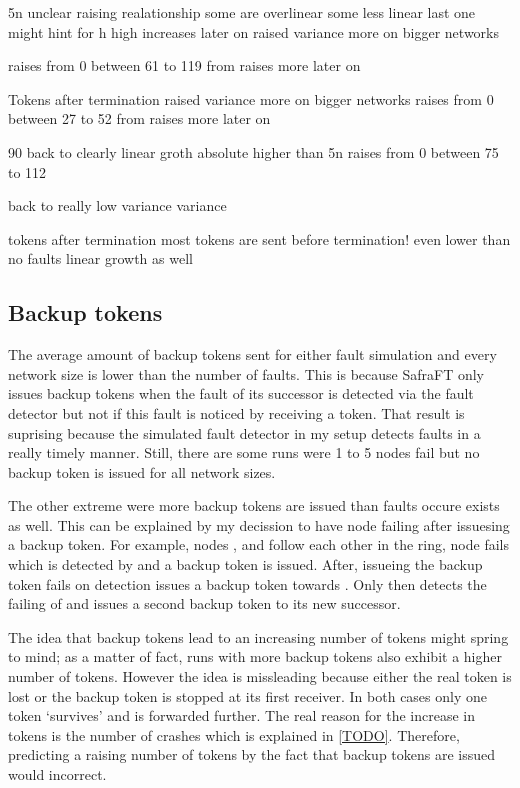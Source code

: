 5n
 unclear raising realationship some are overlinear some less linear last one might hint for h
 high increases later on
 raised variance more on bigger networks
 
 raises from 0 between 61 to 119 from 
   raises more later on
 
 Tokens after termination 
   raised variance more on bigger networks
    raises from 0 between 27 to 52 from 
      raises more later on
   
 
 
90 
  back to clearly linear groth
  absolute higher than 5n 
  raises from 0 between 75 to 112
  
  back to really low variance variance
  
  tokens after termination
    most tokens are sent before termination! 
    even lower than no faults
    linear growth as well
    
\subsection{Backup tokens}
The average amount of backup tokens sent for either fault simulation and every network size is lower than the number of faults.
This is because SafraFT only issues backup tokens when the fault of its successor is detected via the fault detector but not if this fault is noticed by receiving a token.
That result is suprising because the simulated fault detector in my setup detects faults in a really timely manner.
Still, there are some runs were 1 to 5 nodes fail but no backup token is issued for all network sizes. 

The other extreme were more backup tokens are issued than faults occure exists as well.
This can be explained by my decission to have node failing after issuesing a backup token.
For example, nodes ,  and  follow each other in the ring, node  fails which is detected by  and a backup token is issued.
After, issueing the backup token  fails on detection  issues a backup token towards .
Only then  detects the failing of  and issues a second backup token to its new successor.

The idea that backup tokens lead to an increasing number of tokens might spring to mind; as a matter of fact, runs with more backup tokens also exhibit a higher number of tokens.
However the idea is missleading because either the real token is lost or the backup token is stopped at its first receiver.
In both cases only one token `survives' and is forwarded further.
The real reason for the increase in tokens is the number of crashes which is explained in \cref{TODO}.
Therefore, predicting a raising number of tokens by the fact that backup tokens are issued would incorrect.    
  

